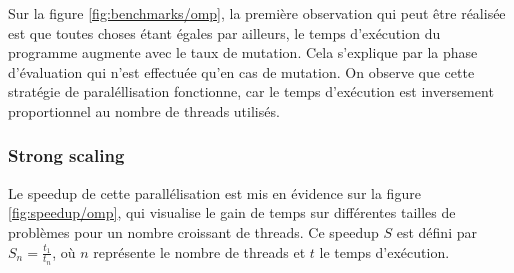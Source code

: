 \documentclass[a4paper, 10pt, twoside]{article}
\begin{document}
Sur la figure \ref{fig:benchmarks/omp}, la première observation qui peut être réalisée est que toutes choses étant égales par ailleurs, le temps d'exécution du programme augmente avec le taux de mutation. Cela s'explique par la phase d'évaluation qui n'est effectuée qu'en cas de mutation. On observe que cette stratégie de paraléllisation fonctionne, car le temps d'exécution est inversement proportionnel au nombre de threads utilisés.

\subsubsection*{Strong scaling}

Le speedup de cette parallélisation est mis en évidence sur la figure \ref{fig:speedup/omp}, qui visualise le gain de temps sur différentes tailles de problèmes pour un nombre croissant de threads.
Ce speedup $S$ est défini par $ S_n = \frac{t_1}{t_n} $, où $n$ représente le nombre de threads et $t$ le temps d'exécution.
\end{document}

